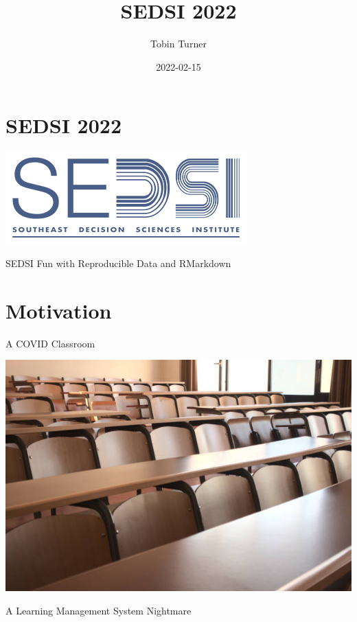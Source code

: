 \documentclass[
]{book}
\title{SEDSI 2022}
\author{Tobin Turner}
\date{2022-02-15}
\begin{document}
\maketitle

{
\setcounter{tocdepth}{1}
\tableofcontents
}
\hypertarget{sedsi-2022}{%
\chapter{SEDSI 2022}\label{sedsi-2022}}

\begin{center}\includegraphics{_images/SEDSI} \end{center}

SEDSI Fun with Reproducible Data and RMarkdown

\hypertarget{motivation}{%
\chapter{Motivation}\label{motivation}}

A COVID Classroom

\begin{center}\includegraphics{_images/empty_class} \end{center}

A Learning Management System Nightmare
\end{document}
